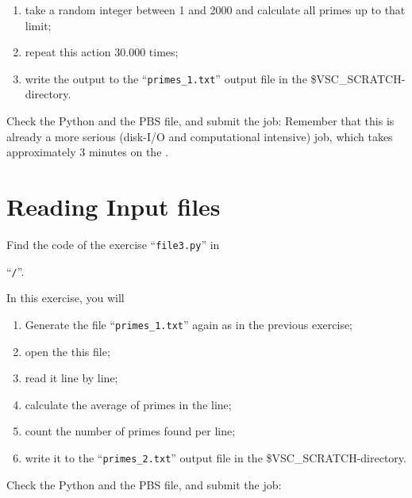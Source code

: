\begin{enumerate}
\item  take a random integer between 1 and 2000 and calculate all primes up to that limit;
\item  repeat this action 30.000 times;
\item  write the output to the ``\texttt{primes\_1.txt}'' output file in the \$VSC\_SCRATCH-directory.
\end{enumerate}

Check the Python and the PBS file, and submit the job: Remember that this is
already a more serious (disk-I/O and computational intensive) job, which takes
approximately 3 minutes on the \hpc.

\begin{prompt}
\end{prompt}

\section{Reading Input files}

\begin{tip}
Find the code of the exercise ``\texttt{file3.py}'' in

``\texttt{\tilde/\exampledir}''.
\end{tip}

In this exercise, you will
\begin{enumerate}
\item  Generate the file ``\texttt{primes\_1.txt}'' again as in the previous exercise;
\item  open the this file;
\item  read it line by line;
\item  calculate the average of primes in the line;
\item  count the number of primes found per line;
\item  write it to the ``\texttt{primes\_2.txt}'' output file in the \$VSC\_SCRATCH-directory.
\end{enumerate}

Check the Python and the PBS file, and submit the job:

\begin{prompt}
\end{prompt}

